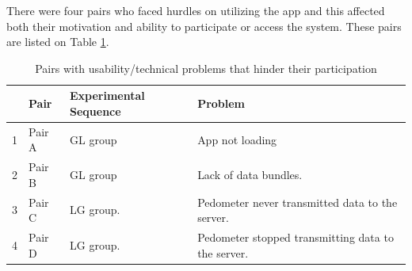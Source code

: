 There were four pairs who faced hurdles on utilizing the app and this affected both their motivation and ability to participate or access the system. These pairs are listed on Table \ref{table:usageproblems}.\newline
\begin{table}[h!]
  \begin{center}
    \caption{Pairs with usability/technical problems that hinder their participation}
    \label{table:usageproblems}
	\begin{tabular}{|l|l|l|p{6cm}|}
		\hline
		&Pair&Experimental Sequence&Problem\\
		\hline
		1&Pair A&GL group &App not loading\\
		\hline
		2&Pair B&GL group&Lack of data bundles. \\
		\hline
		3&Pair C & LG group.& Pedometer never transmitted data to the server.\\
		\hline
		4&Pair D & LG group.& Pedometer stopped transmitting data to the server.\\
	\hline
	\end{tabular}
  \end{center}
\end{table}
\newline 
